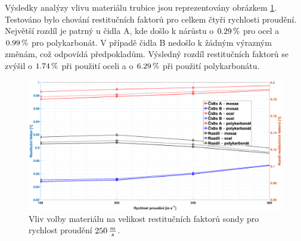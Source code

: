             \begin{table}[ht!]
                \centering
                \caption{Zkoumané materiály trubice.}
                \label{tab:final-materialy}
            \end{table}

            \newpage

            Výsledky analýzy vlivu materiálu trubice jsou reprezentovány obrázkem \ref{fig:sonda-final-materialy}. Testováno bylo chování restitučních faktorů pro celkem čtyři rychlosti proudění. Největší rozdíl je patrný u čidla A, kde došlo k nárůstu o $0.29 \, \%$ pro ocel a $0.99 \, \%$ pro polykarbonát. V případě čidla B nedošlo k žádným výrazným změnám, což odpovídá předpokladům. Výsledný rozdíl restitučních faktorů se zvýšil o $1.74 \, \%$ při použití oceli a o $6.29 \, \%$ při použití polykarbonátu.

            \begin{figure}[ht!]
                \centering
                \includegraphics*[width=\textwidth]{500_FINAL/final_material.eps}
                \caption{Vliv volby materiálu na velikost restitučních faktorů sondy pro rychlost proudění $250 \, \frac{m}{s}$.}
                \label{fig:sonda-final-materialy}
            \end{figure}


        
        